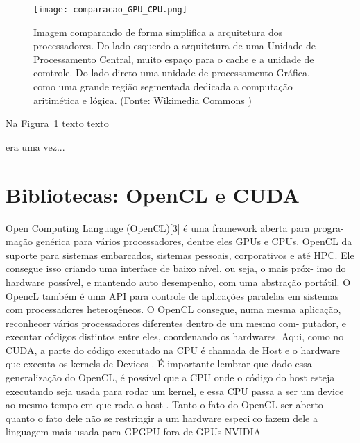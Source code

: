   \begin{figure}[!h]
    \centering
    \texttt{[image: comparacao\_GPU\_CPU.png]}
    \caption{Imagem comparando de forma simplifica a arquitetura dos processadores. Do lado esquerdo a arquitetura de uma Unidade de Processamento Central, muito espaço para o cache e a unidade de comtrole. Do lado direto uma unidade de processamento Gráfica, como uma grande região segmentada dedicada a computação aritimética e lógica. (Fonte: Wikimedia Commons \protect\footnotemark)}
    \label{fig:cpuvsgpu}
  \end{figure}



  Na Figura~\ref{fig:cpuvsgpu} texto texto

  era uma vez...

\section{Bibliotecas: OpenCL e CUDA}
Open Computing Language (OpenCL)[3] é uma framework aberta para progra-
mação genérica para vários processadores, dentre eles GPUs e CPUs. OpenCL
da suporte para sistemas embarcados, sistemas pessoais, corporativos e até HPC.
Ele consegue isso criando uma interface de baixo nível, ou seja, o mais próx-
imo do hardware possível, e mantendo auto desempenho, com uma abstração
portátil. O OpencL também é uma API para controle de aplicações paralelas em
sistemas com processadores heterogêneos. O OpenCL consegue, numa mesma
aplicação, reconhecer vários processadores diferentes dentro de um mesmo com-
putador, e executar códigos distintos entre eles, coordenando os hardwares.
Aqui, como no CUDA, a parte do código executado na CPU é chamada de Host
e o hardware que executa os kernels de Devices . É importante lembrar que
dado essa generalização do OpenCL, é possível que a CPU onde o código do
host esteja executando seja usada para rodar um kernel, e essa CPU passa a ser
um device ao mesmo tempo em que roda o host . Tanto o fato do OpenCL ser
aberto quanto o fato dele não se restringir a um hardware especico fazem dele
a linguagem mais usada para GPGPU fora de GPUs NVIDIA

